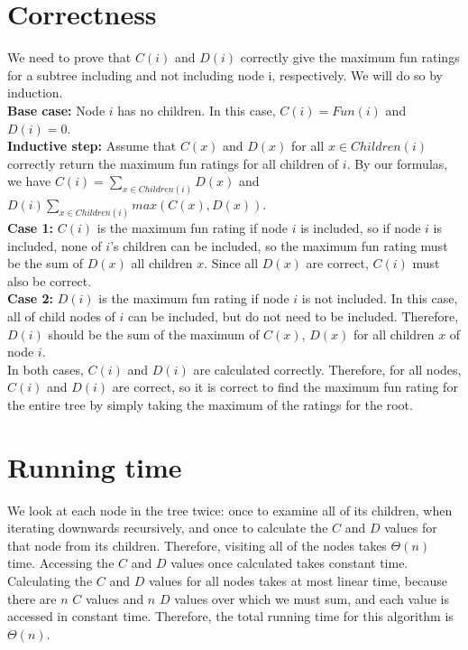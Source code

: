 \documentclass[12pt]{article}
\begin{document}
\section*{Correctness}
We need to prove that $C(i)$ and $D(i)$ correctly give the maximum fun ratings for a subtree including and not including node i, respectively. We will do so by induction.\\
\textbf{Base case:} Node $i$ has no children. In this case, $C(i) = Fun(i)$ and $D(i) = 0$.\\
\textbf{Inductive step:} Assume that $C(x)$ and $D(x)$ for all $x \in Children(i)$ correctly return the maximum fun ratings for all children of $i$. By our formulas, we have $C(i) = \sum_{x \in Children(i)} D(x)$ and $D(i) \sum_{x \in Children(i)} max(C(x), D(x))$.\\
\textbf{Case 1:} $C(i)$ is the maximum fun rating if node $i$ is included, so if node $i$ is included, none of $i$'s children can be included, so the maximum fun rating must be the sum of $D(x)$ all children $x$. Since all $D(x)$ are correct, $C(i)$ must also be correct.\\
\textbf{Case 2:} $D(i)$ is the maximum fun rating if node $i$ is not included. In this case, all of child nodes of $i$ can be included, but do not need to be included. Therefore, $D(i)$ should be the sum of the maximum of $C(x)$, $D(x)$ for all children $x$ of node $i$.\\
In both cases, $C(i)$ and $D(i)$ are calculated correctly. Therefore, for all nodes, $C(i)$ and $D(i)$ are correct, so it is correct to find the maximum fun rating for the entire tree by simply taking the maximum of the ratings for the root.\\

\section*{Running time}
We look at each node in the tree twice: once to examine all of its children, when iterating downwards recursively, and once to calculate the $C$ and $D$ values for that node from its children. Therefore, visiting all of the nodes takes $\Theta(n)$ time. Accessing the $C$ and $D$ values once calculated takes constant time. Calculating the $C$ and $D$ values for all nodes takes at most linear time, because there are $n$ $C$ values and $n$ $D$ values over which we must sum, and each value is accessed in constant time. Therefore, the total running time for this algorithm is $\Theta(n)$.
\end{document}
